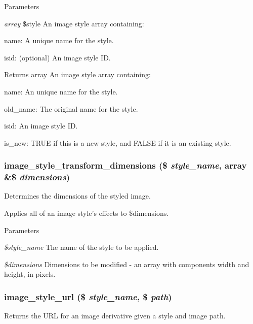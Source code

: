 \begin{DoxyParams}{Parameters}
\item[{\em array}]\$style An image style array containing:
\begin{DoxyItemize}
\item name: A unique name for the style.
\item isid: (optional) An image style ID.
\end{DoxyItemize}\end{DoxyParams}
\begin{DoxyReturn}{Returns}
array An image style array containing:
\begin{DoxyItemize}
\item name: An unique name for the style.
\item old\_\-name: The original name for the style.
\item isid: An image style ID.
\item is\_\-new: TRUE if this is a new style, and FALSE if it is an existing style. 
\end{DoxyItemize}
\end{DoxyReturn}
\hypertarget{image_8module_a4cde7d67cc8cce2fa6fc3a11880947f8}{
\subsubsection[{image\_\-style\_\-transform\_\-dimensions}]{\setlength{\rightskip}{0pt plus 5cm}image\_\-style\_\-transform\_\-dimensions (\$ {\em style\_\-name}, \/  array \&\$ {\em dimensions})}}
\label{image_8module_a4cde7d67cc8cce2fa6fc3a11880947f8}
Determines the dimensions of the styled image.

Applies all of an image style's effects to \$dimensions.


\begin{DoxyParams}{Parameters}
\item[{\em \$style\_\-name}]The name of the style to be applied. \item[{\em \$dimensions}]Dimensions to be modified -\/ an array with components width and height, in pixels. \end{DoxyParams}
\hypertarget{image_8module_a306cf59855e3462ac9539850d4c763eb}{
\subsubsection[{image\_\-style\_\-url}]{\setlength{\rightskip}{0pt plus 5cm}image\_\-style\_\-url (\$ {\em style\_\-name}, \/  \$ {\em path})}}
\label{image_8module_a306cf59855e3462ac9539850d4c763eb}
Returns the URL for an image derivative given a style and image path.



